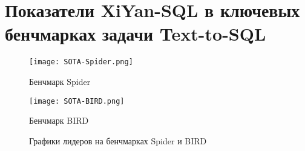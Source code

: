 \chapter{Показатели XiYan-SQL в ключевых бенчмарках задачи Text-to-SQL}

\begin{figure}[h]
	\centering
	\begin{subcaptiongroup}
		\texttt{[image: SOTA-Spider.png]}
		\caption{Бенчмарк Spider}
		\label{fig:SOTA-Spider}
		\texttt{[image: SOTA-BIRD.png]}
		\caption{Бенчмарк BIRD}
		\label{fig:SOTA-Bird}
	\end{subcaptiongroup}
	\captionsetup{subrefformat=parens}
	\caption{Графики лидеров на бенчмарках Spider и BIRD}
	\label{fig:SOTA-Spider-Bird}
\end{figure}